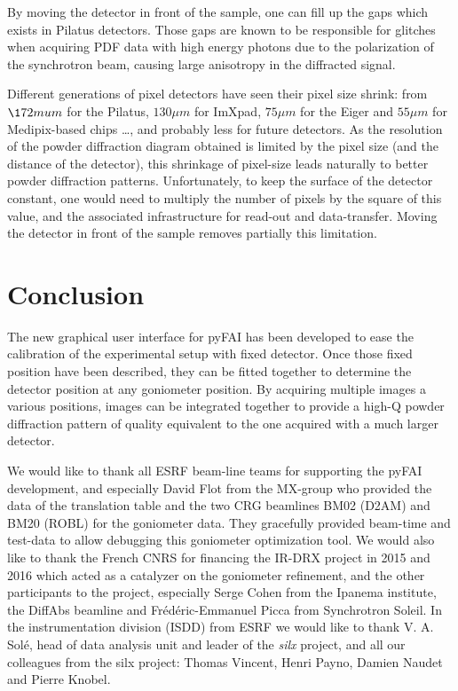\documentclass[preprint, pdf]{iucr}              %
\begin{document}
By moving the detector in front of the sample, one can fill up the
gaps which exists in Pilatus detectors. 
Those gaps are known to be responsible for glitches
when acquiring PDF data with high energy photons due to the
polarization of the synchrotron beam, causing large anisotropy in the
diffracted signal.

Different generations of pixel detectors have seen their pixel size
shrink:
from $\172 mu m$ for the Pilatus, $130 \mu m$ for ImXpad, $75 \mu m$ for the
Eiger and $55 \mu m$ for Medipix-based chips \ldots, and probably less for
future detectors.
As the resolution of the powder diffraction diagram obtained is limited by the
pixel size (and the distance of the detector), this shrinkage of pixel-size
leads naturally to better powder diffraction patterns. 
Unfortunately, to keep the surface of the detector constant, one would need
to multiply the number of pixels by the square of this value, and the
associated infrastructure for read-out and data-transfer. 
Moving the detector in front of the sample removes partially this limitation.

\section{Conclusion}

The new graphical user interface for pyFAI has been developed to ease the
calibration of the experimental setup with fixed detector. 
Once those fixed position have been described, they can be fitted together to
determine the detector position at any goniometer position. 
By acquiring multiple images a various positions, images can be
integrated together to provide a high-Q powder diffraction pattern of
quality equivalent to the one acquired with a much larger detector. 



 

We would like to thank all ESRF beam-line teams for supporting the
pyFAI development, and especially David Flot from the MX-group who provided the
data of the translation table and the two CRG beamlines BM02 (D2AM) and BM20
(ROBL) for the goniometer data. 
They gracefully provided beam-time and test-data to allow debugging this 
goniometer optimization tool.
We would also like to thank the French CNRS for financing the IR-DRX project
in 2015 and 2016 which acted as a catalyzer on the goniometer refinement,
and the other participants to the project, especially Serge Cohen from the
Ipanema institute, the DiffAbs beamline and Frédéric-Emmanuel Picca from
Synchrotron Soleil.
In the instrumentation division (ISDD) from ESRF  we would like to thank V. A.
Solé, head of data analysis unit and leader of the \textit{silx} project, and all our
colleagues from the silx project: Thomas Vincent, Henri Payno, Damien Naudet and
Pierre Knobel.
\end{document}

